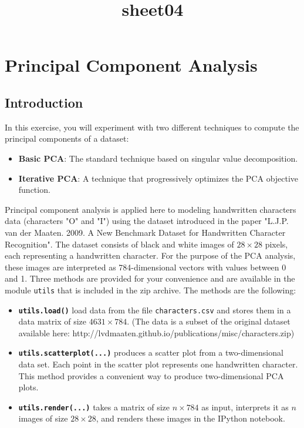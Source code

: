 \documentclass[11pt]{article}
\title{sheet04}
\begin{document}
    
    
    \maketitle
    
    

    
    \section{Principal Component
Analysis}\label{principal-component-analysis}

\subsection{Introduction}\label{introduction}

In this exercise, you will experiment with two different techniques to
compute the principal components of a dataset:

\begin{itemize}
\item
  \textbf{Basic PCA}: The standard technique based on singular value
  decomposition.
\item
  \textbf{Iterative PCA}: A technique that progressively optimizes the
  PCA objective function.
\end{itemize}

Principal component analysis is applied here to modeling handwritten
characters data (characters "O" and "I") using the dataset introduced in
the paper "L.J.P. van der Maaten. 2009. A New Benchmark Dataset for
Handwritten Character Recognition". The dataset consists of black and
white images of \(28 \times 28\) pixels, each representing a handwritten
character. For the purpose of the PCA analysis, these images are
interpreted as 784-dimensional vectors with values between 0 and 1.
Three methods are provided for your convenience and are available in the
module \texttt{utils} that is included in the zip archive. The methods
are the following:

\begin{itemize}
\item
  \textbf{\texttt{utils.load()}} load data from the file
  \texttt{characters.csv} and stores them in a data matrix of size
  \(4631 \times 784\). (The data is a subset of the original dataset
  available here:
  http://lvdmaaten.github.io/publications/misc/characters.zip)
\item
  \textbf{\texttt{utils.scatterplot(...)}} produces a scatter plot from
  a two-dimensional data set. Each point in the scatter plot represents
  one handwritten character. This method provides a convenient way to
  produce two-dimensional PCA plots.
\item
  \textbf{\texttt{utils.render(...)}} takes a matrix of size
  \(n \times 784\) as input, interprets it as \(n\) images of size
  \(28 \times 28\), and renders these images in the IPython notebook.
\end{itemize}
\end{document}

